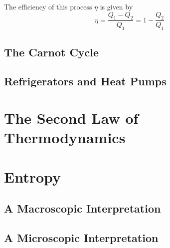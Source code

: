 \documentclass[a4paper,12pt]{article}
\let\oldsection\section
\renewcommand\section{\clearpage\oldsection}
\begin{document}
The efficiency of this process $\eta$ is given by
\begin{equation}\label{eq:heat_engine_efficiency}
  \eta = \frac{Q_1 - Q_2}{Q_1} = 1 - \dfrac{Q_2}{Q_1}
\end{equation}

\pagebreak

\subsection{The Carnot Cycle}



\subsection{Refrigerators and Heat Pumps}

\section{The Second Law of Thermodynamics}

\section{Entropy}

\subsection{A Macroscopic Interpretation}

\subsection{A Microscopic Interpretation}
\end{document}
